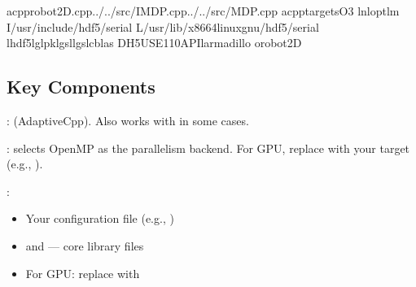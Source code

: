 \documentclass[a4paper,10pt,english]{sphinxmanual}
\begin{document}
\begin{sphinxVerbatim}[commandchars=\\\{\}]
acpprobot2D.cpp../../src/IMDP.cpp../../src/MDP.cpp
\PYGZhy{}\PYGZhy{}acpp\PYGZhy{}targets\PYGZhy{}O3
\PYGZhy{}lnlopt\PYGZhy{}lm
\PYGZhy{}I/usr/include/hdf5/serial
\PYGZhy{}L/usr/lib/x86\PYGZus{}64\PYGZhy{}linux\PYGZhy{}gnu/hdf5/serial
\PYGZhy{}lhdf5\PYGZhy{}lglpk\PYGZhy{}lgsl\PYGZhy{}lgslcblas
\PYGZhy{}DH5\PYGZus{}USE\PYGZus{}110\PYGZus{}API\PYGZhy{}larmadillo
\PYGZhy{}orobot2D
\end{sphinxVerbatim}


\subsection{Key Components}
\label{\detokenize{user-guide/makefiles:key-components}}
\sphinxAtStartPar
{}:  (AdaptiveCpp). Also works with  in some cases.

\sphinxAtStartPar
{}:  selects OpenMP as the parallelism backend.
For GPU, replace with your target (e.g., ).

\sphinxAtStartPar
{}:
\begin{itemize}
\item {} 
\sphinxAtStartPar
Your configuration file (e.g., )

\item {} 
\sphinxAtStartPar
{} and  — core library files

\item {} 
\sphinxAtStartPar
For GPU: replace  with 

\end{itemize}
\end{document}
